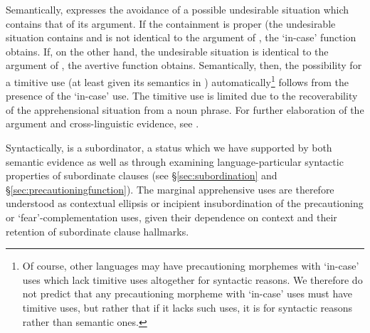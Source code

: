 \documentclass[output=paper,colorlinks,citecolor=brown]{langscibook}
\begin{document}
Semantically,  expresses the avoidance of a possible undesirable situation which contains that of its argument. If the containment is proper (\ie the undesirable situation contains and is not identical to the argument of , the `in-case' function obtains. If, on the other hand, the undesirable situation is identical to the argument of , the avertive function obtains. Semantically, then, the possibility for a timitive use (at least given its semantics in ) automatically\footnote{Of course, other languages may have precautioning morphemes with `in-case' uses which lack timitive uses altogether for syntactic reasons. We therefore do not predict that any precautioning morpheme with `in-case' uses must have timitive uses, but rather that if it lacks such uses, it is for syntactic reasons rather than semantic ones.} follows from the presence of the `in-case' use. The timitive use is limited due to the recoverability of the apprehensional situation from a noun phrase. For further elaboration of the argument and cross-linguistic evidence, see \citet{anderbois2020salt}.

Syntactically,  is a subordinator, a status which we have supported by both semantic evidence as well as through examining language-par\-tic\-ular syntactic properties of subordinate clauses (see \S\ref{sec:subordination} and \S\ref{sec:precautioningfunction}). The marginal apprehensive uses are therefore understood as contextual ellipsis or incipient insubordination of the precautioning or `fear'-complementation uses, given their dependence on context and their retention of  subordinate clause hallmarks.
\end{document}
